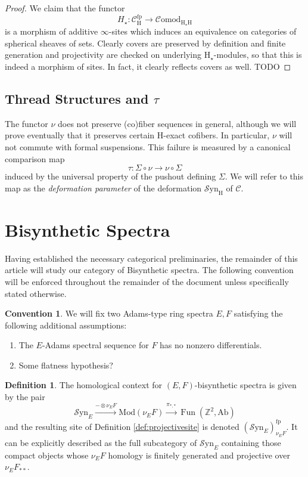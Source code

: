 \documentclass[10pt]{amsart}
\theoremstyle{definition}
\numberwithin{figure}{section}
\numberwithin{equation}{section}
\newtheorem{definition}[figure]{Definition}
\newtheorem{convention}[figure]{Convention}
\newcommand{\cC}{\mathcal{C}}
\theoremstyle{cited}
\newcommand{\bZ}{\mathbb{Z}}
\newcommand{\Fun}{\operatorname{Fun}}
\newcommand{\Ab}{\mathrm{Ab}}
\newcommand{\Mod}{\mathrm{Mod}}
\newcommand{\fp}{\mathrm{fp}}
\newcommand{\Syn}{\mathcal{S}\mathrm{yn}}
\renewcommand{\H}{\mathrm{H}}
\newcommand{\Comod}{\mathcal{C}\mathrm{omod}}
\begin{document}
\begin{proof}
  We claim that the functor
  \[
  H_\star:\cC_\H^\fp \to \Comod_{\H_\star\H}
  \]
  is a morphism of additive $\infty$-sites which induces an equivalence on categories of spherical sheaves of sets. Clearly covers are preserved by definition and finite generation and projectivity are checked on underlying $\H_\star$-modules, so that this is indeed a morphism of sites. In fact, it clearly reflects covers as well. TODO
\end{proof}


\subsection{Thread Structures and $\tau$}

The functor $\nu$ does not preserve (co)fiber sequences in general, although we will prove eventually that it preserves certain $\H$-exact cofibers. In particular, $\nu$ will not commute with formal suspensions. This failure is measured by a canonical comparison map
\[
\tau: \Sigma \circ \nu \to \nu \circ \Sigma
\]
induced by the universal property of the pushout defining $\Sigma$. We will refer to this map as the \textit{deformation parameter} of the deformation $\Syn_\H$ of $\cC$. 


\section{Bisynthetic Spectra}

Having established the necessary categorical preliminaries, the remainder of this article will study our category of Bisynthetic spectra. The following convention will be enforced throughout the remainder of the document unless specifically stated otherwise. 

\begin{convention}
  We will fix two Adams-type ring spectra $E,F$ satisfying the following additional assumptions:
  \begin{enumerate}
      \item The $E$-Adams spectral sequence for $F$ has no nonzero differentials.
      \item Some flatness hypothesis?
  \end{enumerate}
\end{convention}

\begin{definition}
  The homological context for $(E,F)$-bisynthetic spectra is given by the pair
  \[
  \Syn_{E} \xrightarrow{-\otimes \nu_E F} \Mod(\nu_E F) \xrightarrow{\pi_{*,*}} \Fun(\bZ^2, \Ab)
  \]
  and the resulting site of Definition \ref{def:projectivesite} is denoted $(\Syn_E)_{\nu_E F}^\fp$. It can be explicitly described as the full subcategory of $\Syn_E$ containing those compact objects whose $\nu_E F$ homology is finitely generated and projective over $\nu_E F_{**}$.
\end{definition}
\end{document}
